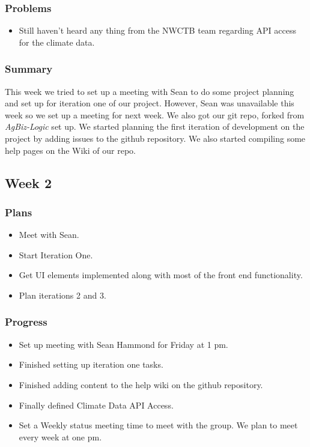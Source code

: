 \documentclass[onecolumn, draftclsnofoot,10pt, compsoc]{article}
\begin{document}
			\subsubsection{Problems}
				\begin{itemize}
					\item Still haven't heard any thing from the NWCTB team regarding API access for the climate data.
				\end{itemize}
				
			\subsubsection{Summary}
			This week we tried to set up a meeting with Sean to do some project planning and set up for iteration one of our project. However, Sean was unavailable this week so we set up a meeting for next week. We also got our git repo, forked from \textit{AgBiz-Logic} set up. We started planning the first iteration of development on the project by adding issues to the github repository. We also started compiling some help pages on the Wiki of our repo.\\
			
		\subsection{Week 2}
			\subsubsection{Plans}
				\begin{itemize}
					\item Meet with Sean.
					\item Start Iteration One.
					\item Get UI elements implemented along with most of the front end functionality.
					\item Plan iterations 2 and 3.
				\end{itemize}
			\subsubsection{Progress}
				\begin{itemize}
					\item Set up meeting with Sean Hammond for Friday at 1 pm.
					\item Finished setting up iteration one tasks.
					\item Finished adding content to the help wiki on the github repository.
					\item Finally defined Climate Data API Access.
					\item Set a Weekly status meeting time to meet with the group. We plan to meet every week at one pm.
				\end{itemize}
\end{document}
